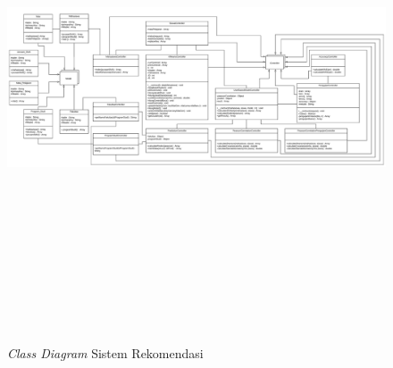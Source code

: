 \begin{figure}[H]
    \centering
    \includegraphics[width = 20cm, height = 15cm, angle = 90]{Gambar/gambar45.png}
    \caption{\textit{Class Diagram} Sistem Rekomendasi}
    \label{fig:class diagram sistem rekomendasi}
\end{figure}